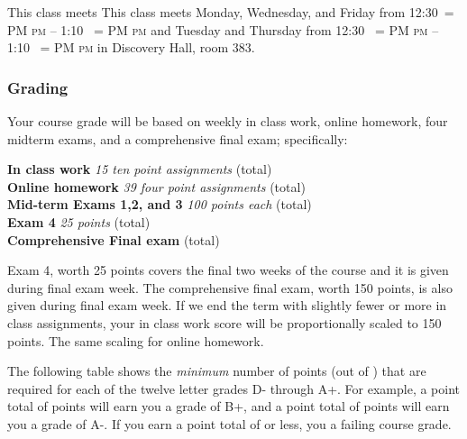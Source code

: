 \documentclass[12pt]{article}
\makeatletter
\newcounter{ex}\setcounter{ex}{0}
\newenvironment{mypar}[2]
  {\begin{list}{}%
    {\setlength\leftmargin{#1}
    \setlength\rightmargin{#2}}
    \item[]}
  {\end{list}}
\DeclareRobustCommand{\maybefakesc}[1]{%
  \ifnum\pdfstrcmp{\f@series}{\bfdefault}=\z@
    {\fontsize{\dimexpr0.8\dimexpr\f@size pt\relax}{0}\selectfont\uppercase{#1}}%
  \else
    \textsc{#1}%
  \fi
}
\newcommand\PM{\,\maybefakesc{pm}\xspace}
\newcommand{\room}{Discovery Hall, room  383}
\newcommand{\meetingtime}{This class meets Monday, Wednesday, and Friday  from 
	12:30\PM{}  --  1:10 \PM and Tuesday and Thursday from 12:30 \PM{} -- 1:10 \PM }
\makeatother
\begin{document}
This class meets \meetingtime{} in \room.


\subsubsection*{Grading}

Your course grade will be based on weekly in class work, online homework, four midterm exams, and a comprehensive 
final exam; specifically:
\begin{mypar}{0.25in}{0.25in}
      \textbf{In class work}  \emph{15 ten point assignments}   (total) \\
     \textbf{Online homework} \emph{39 four point assignments } (total)\\
    \textbf{Mid-term Exams 1,2, and 3} \emph{100 points each}  (total)\\
   \textbf{Exam 4} \emph{25 points}  (total)\\ 
      \textbf{Comprehensive Final exam}  (total)
\end{mypar}
Exam 4, worth 25 points covers the final two weeks of the course and it is given 
during final exam week. The comprehensive final exam, worth 150 points, is also 
given during final exam week. If we end the term with slightly fewer or more in class
assignments, your in class work score will be proportionally scaled to 150 points. The same 
scaling for online homework.






The following table shows the \emph{minimum} number of points (out of \points) that
are required for each of the twelve letter grades D- through A+. For
example, a point total of \Bp\/  points will earn you a grade of B+,  and 
a point total of \Am\/ points will earn you a grade of A-. If you earn a point
total of \F\/  or less, you a failing course grade.
 
\end{document}
